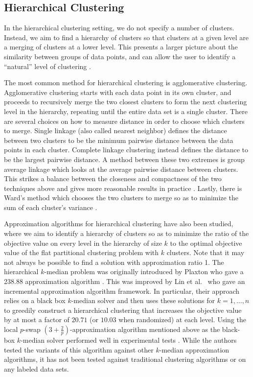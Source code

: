 \documentclass{article}
\begin{document}
\subsection{Hierarchical Clustering}

In the hierarchical clustering setting, we do not specify a number of clusters. Instead, we aim to find a hierarchy of clusters so that clusters at a given level are a merging of clusters at a lower level. This presents a larger picture about the similarity between groups of data points, and can allow the user to identify a ``natural'' level of clustering \cite{ESL}. 

The most common method for hierarchical clustering is agglomerative clustering. Agglomerative clustering starts with each data point in its own cluster, and proceeds to recursively merge the two closest clusters to form the next clustering level in the hierarchy, repeating until the entire data set is a single cluster.  There are several choices on how to measure distance in order to choose which clusters to merge. Single linkage (also called nearest neighbor) defines the distance between two clusters to be the minimum pairwise distance between the data points in each cluster.  Complete linkage clustering instead defines the distance to be the largest pairwise distance. A method between these two extremes is group average linkage which looks at the average pairwise distance between clusters. This strikes a balance between the closeness and compactness of the two techniques above and gives more reasonable results in practice \cite{ESL}. Lastly, there is Ward's method which chooses the two clusters to merge so as to minimize the sum of each cluster's variance \cite{Ward}.

Approximation algorithms for hierarchical clustering have also been studied, where we aim to identify a hierarchy of clusters so as to minimize the ratio of the objective value on every level in the hierarchy of size $k$ to the optimal objective value of the flat partitional clustering problem with $k$ clusters. Note that it may not always be possible to find a solution with approximation ratio 1. The hierarchical $k$-median problem was originally introduced by Plaxton who gave a 238.88 approximation algorithm \cite{Plaxton}. This was improved by Lin et al.~\cite{Lin} who gave an incremental approximation algorithm framework. In particular, their approach relies on a black box $k$-median solver and then uses these solutions for $k=1, \ldots, n$ to greedily construct a hierarchical clustering that increases the objective value by at most a factor of $20.71$ (or $10.03$ when randomized) at each level. Using the local $p$-swap $(3+\frac{2}{p})$-approximation algorithm mentioned above as the black-box $k$-median solver performed well in experimental tests \cite{Nagarajan}. While the authors tested the variants of this algorithm against other $k$-median approximation algorithms, it has not been tested against traditional clustering algorithms or on any labeled data sets. 
\end{document}
